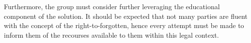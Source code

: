 Furthermore, the group must consider further leveraging the educational component of the solution. It should be expected that not many parties are fluent with the concept of the right-to-forgotten, hence every attempt must be made to inform them of the recourses available to them within this legal context.
